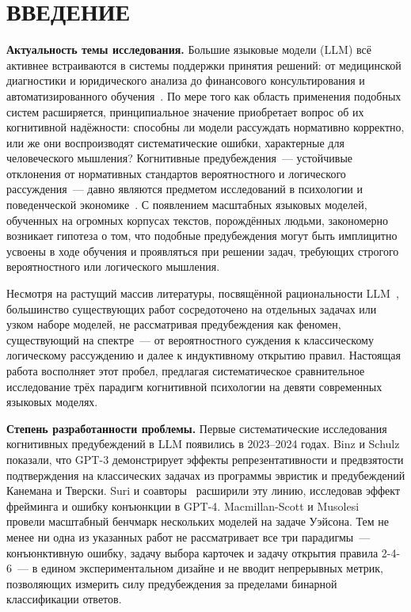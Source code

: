 \chapter*{ВВЕДЕНИЕ}
\sloppy

\textbf{Актуальность темы исследования.}
Большие языковые модели (LLM) всё активнее встраиваются в системы поддержки принятия решений: от медицинской диагностики и юридического анализа до финансового консультирования и автоматизированного обучения~\cite{bommasani2021opportunities}. По мере того как область применения подобных систем расширяется, принципиальное значение приобретает вопрос об их когнитивной надёжности: способны ли модели рассуждать нормативно корректно, или же они воспроизводят систематические ошибки, характерные для человеческого мышления? Когнитивные предубеждения~--- устойчивые отклонения от нормативных стандартов вероятностного и логического рассуждения~--- давно являются предметом исследований в психологии и поведенческой экономике~\cite{kahneman2011thinking}. С появлением масштабных языковых моделей, обученных на огромных корпусах текстов, порождённых людьми, закономерно возникает гипотеза о том, что подобные предубеждения могут быть имплицитно усвоены в ходе обучения и проявляться при решении задач, требующих строгого вероятностного или логического мышления.

Несмотря на растущий массив литературы, посвящённой рациональности LLM~\cite{binz2023using, suri2024large, macmillan2024irrationality}, большинство существующих работ сосредоточено на отдельных задачах или узком наборе моделей, не рассматривая предубеждения как феномен, существующий на спектре~--- от вероятностного суждения к классическому логическому рассуждению и далее к индуктивному открытию правил. Настоящая работа восполняет этот пробел, предлагая систематическое сравнительное исследование трёх парадигм когнитивной психологии на девяти современных языковых моделях.

\textbf{Степень разработанности проблемы.}
Первые систематические исследования когнитивных предубеждений в LLM появились в 2023--2024 годах. Binz и Schulz~\cite{binz2023using} показали, что GPT-3 демонстрирует эффекты репрезентативности и предвзятости подтверждения на классических задачах из программы эвристик и предубеждений Канемана и Тверски. Suri и соавторы~\cite{suri2024large} расширили эту линию, исследовав эффект фрейминга и ошибку конъюнкции в GPT-4. Macmillan-Scott и Musolesi~\cite{macmillan2024irrationality} провели масштабный бенчмарк нескольких моделей на задаче Уэйсона. Тем не менее ни одна из указанных работ не рассматривает все три парадигмы~--- конъюнктивную ошибку, задачу выбора карточек и задачу открытия правила 2-4-6~--- в едином экспериментальном дизайне и не вводит непрерывных метрик, позволяющих измерить силу предубеждения за пределами бинарной классификации ответов.

